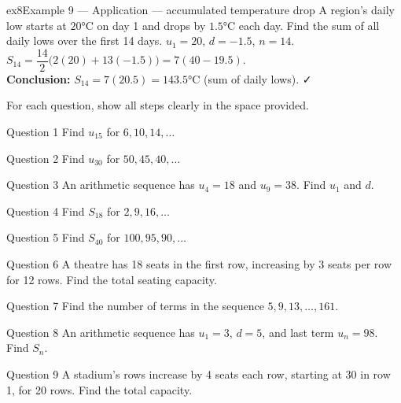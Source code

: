 \documentclass[11pt]{article}
\begin{document}
\begin{example}{ex8}{Example 9 --- Application --- accumulated temperature drop}
A region's daily low starts at $20°$C on day 1 and drops by $1.5°$C each day. Find the sum of all daily lows over the first 14 days.\soln
$u_1=20$, $d=-1.5$, $n=14$. $S_{14}=\dfrac{14}2\big(2(20)+13(-1.5)\big)=7(40-19.5)$.\\[3pt]
\textbf{Conclusion:} $S_{14}=7(20.5)=143.5°$C (sum of daily lows). ✓
\end{example}

\clearpage
{}
For each question, show all steps clearly in the space provided.

\begin{qbox}{Question 1}
Find $u_{15}$ for $6,10,14,\dots$\workspace{2.4cm}
\end{qbox}

\begin{qbox}{Question 2}
Find $u_{30}$ for $50,45,40,\dots$\workspace{2.4cm}
\end{qbox}

\begin{qbox}{Question 3}
An arithmetic sequence has $u_4=18$ and $u_9=38$. Find $u_1$ and $d$.\workspace{2.4cm}
\end{qbox}

\begin{qbox}{Question 4}
Find $S_{18}$ for $2,9,16,\dots$\workspace{2.4cm}
\end{qbox}

\begin{qbox}{Question 5}
Find $S_{40}$ for $100,95,90,\dots$\workspace{2.4cm}
\end{qbox}

\begin{qbox}{Question 6}
A theatre has 18 seats in the first row, increasing by 3 seats per row for 12 rows. Find the total seating capacity.\workspace{2.4cm}
\end{qbox}

\begin{qbox}{Question 7}
Find the number of terms in the sequence $5,9,13,\dots,161$.\workspace{2.4cm}
\end{qbox}

\begin{qbox}{Question 8}
An arithmetic sequence has $u_1=3$, $d=5$, and last term $u_n=98$. Find $S_n$.\workspace{2.4cm}
\end{qbox}

\begin{qbox}{Question 9}
A stadium's rows increase by 4 seats each row, starting at 30 in row 1, for 20 rows. Find the total capacity.\workspace{2.4cm}
\end{qbox}
\end{document}
